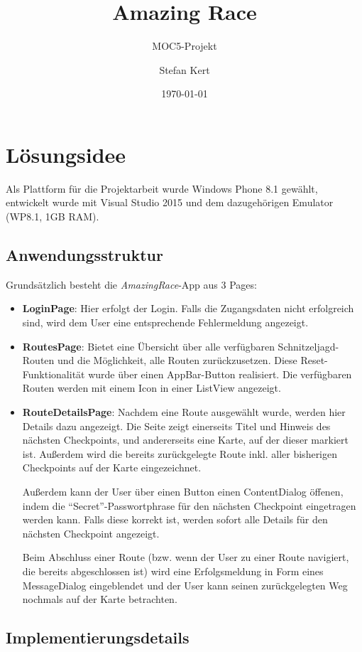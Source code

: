 \documentclass[a4paper,ngerman]{scrartcl}
\begin{document}
\title{Amazing Race}
\subtitle{MOC5-Projekt}
\author{Stefan Kert}
\date{\today}
\maketitle

\section{Lösungsidee}
Als Plattform für die Projektarbeit wurde Windows Phone 8.1 gewählt, entwickelt wurde mit Visual Studio 2015 und dem dazugehörigen Emulator (WP8.1, 1GB RAM).
\subsection{Anwendungsstruktur}
\label{cha:Anwendungsstruktur}
Grundsätzlich besteht die \textit{AmazingRace}-App aus 3 Pages:
\begin{itemize}
	\item \textbf{LoginPage}: Hier erfolgt der Login. Falls die Zugangsdaten nicht erfolgreich sind, wird dem User eine entsprechende Fehlermeldung angezeigt.
	\item \textbf{RoutesPage}: Bietet eine Übersicht über alle verfügbaren Schnitzeljagd-Routen und die Möglichkeit, alle Routen zurückzusetzen. Diese Reset-Funktionalität wurde über einen AppBar-Button realisiert. Die verfügbaren Routen werden mit einem Icon in einer ListView angezeigt.
	\item \textbf{RouteDetailsPage}: Nachdem eine Route ausgewählt wurde, werden hier Details dazu angezeigt. Die Seite zeigt einerseits Titel und Hinweis des nächsten Checkpoints, und andererseits eine Karte, auf der dieser markiert ist. Außerdem wird die bereits zurückgelegte Route inkl. aller bisherigen Checkpoints auf der Karte eingezeichnet.
	
Außerdem kann der User über einen Button einen ContentDialog öffenen, indem die "`Secret"'-Passwortphrase für den nächsten Checkpoint eingetragen werden kann. Falls diese korrekt ist, werden sofort alle Details für den nächsten Checkpoint angezeigt.

Beim Abschluss einer Route (bzw. wenn der User zu einer Route navigiert, die bereits abgeschlossen ist) wird eine Erfolgsmeldung in Form eines MessageDialog eingeblendet und der User kann seinen zurückgelegten Weg nochmals auf der Karte betrachten.
\end{itemize}
\subsection{Implementierungsdetails}
\end{document}
